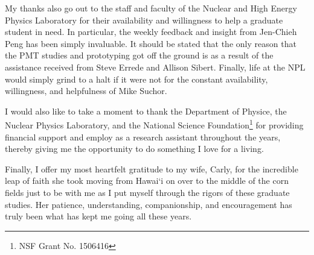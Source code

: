 \documentclass[edeposit,fullpage]{uiucthesis2009}
\begin{document}
My thanks also go out to the staff and faculty of the Nuclear and High Energy Physics Laboratory for their availability and willingness to help a graduate student in need. In particular, the weekly feedback and insight from Jen-Chieh Peng has been simply invaluable. It should be stated that the only reason that the PMT studies and prototyping got off the ground is as a result of the assistance received from Steve Errede and Allison Sibert. Finally, life at the NPL would simply grind to a halt if it were not for the constant availability, willingness, and helpfulness of Mike Suchor.

I would also like to take a moment to thank the Department of Physice, the Nuclear Physics Laboratory, and the National Science Foundation\footnote{NSF Grant No. 1506416} for providing financial support and employ as a research assistant throughout the years, thereby giving me the opportunity to do something I love for a living.

Finally, I offer my most heartfelt gratitude to my wife, Carly, for the incredible leap of faith she took moving from Hawai`i on over to the middle of the corn fields just to be with me as I put myself through the rigors of these graduate studies. Her patience, understanding, companionship, and encouragement has truly been what has kept me going all these years.

%

\backmatter



\end{document}
